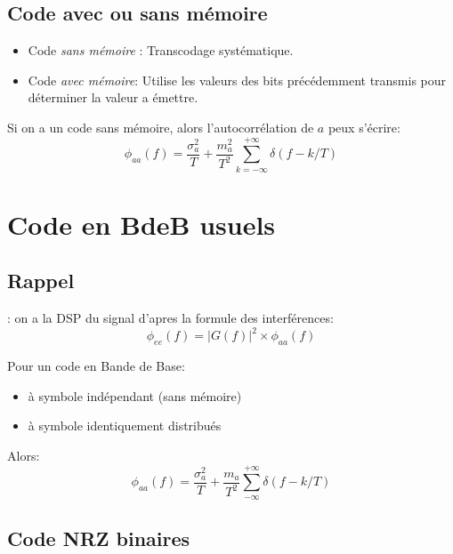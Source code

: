 \documentclass[main.tex]{subfiles}
\begin{document}
\subsection{Code avec ou sans mémoire}
\begin{defin}
  \begin{itemize}
  \item Code \emph{sans mémoire} :
    Transcodage systématique.
  \item Code \emph{avec mémoire}:
    Utilise les valeurs des bits précédemment transmis pour déterminer la valeur a émettre.
  \end{itemize}
\end{defin}


\begin{prop}
  Si on a un code sans mémoire, alors l'autocorrélation de $a$ peux s'écrire:
  \[
    \phi_{aa}(f) = \frac{\sigma_a^2}{T} + \frac{m_a^2}{T^2}\sum_{k=-\infty}^{+\infty} \delta(f-k/T)
  \]
\end{prop}
\section{Code en BdeB usuels}
\subsection{Rappel}: on a la DSP du signal d'apres la formule des interférences:
\[
  \phi_{ee}(f) = |G(f)|^2\times \phi_{aa}(f)
\]
\begin{prop}
  Pour un code en Bande de Base:
  \begin{itemize}
  \item à symbole indépendant (sans mémoire)
  \item à symbole identiquement distribués
  \end{itemize}
  Alors:
  \[
    \phi_{aa}(f) =\frac{\sigma_a^2}{T}+\frac{m_a}{T^2}\sum_{-\infty}^{+\infty}\delta(f-k/T)
  \]
\end{prop}
\subsection{Code NRZ binaires}
\end{document}

